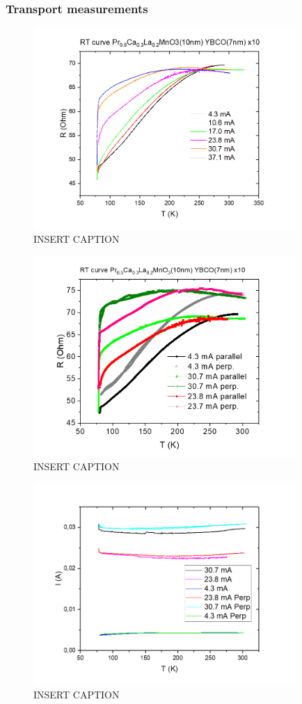 \documentclass{comjnl}
\begin{document}
\subsubsection{Transport measurements}
\begin{figure}[h]
\centering
\includegraphics[width=100mm]{Bilde1.png}
\caption{INSERT CAPTION \label{fig:res_norm}}
\end{figure}
\begin{figure}[h]
\centering
\includegraphics[width=100mm]{Bilde2.png}
\caption{INSERT CAPTION \label{fig:res}}
\end{figure}
\begin{figure}[h]
\centering
\includegraphics[width=100mm]{Bilde3.png}
\caption{INSERT CAPTION \label{fig:cur}}
\end{figure}
\end{document}
